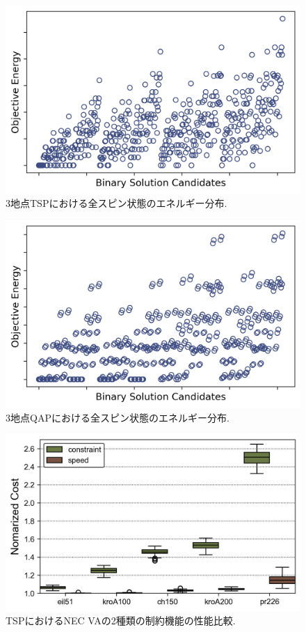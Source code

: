 \documentclass[submit,techrep,noauthor]{ipsj}
\begin{document}
\begin{figure}[hb]
\centering
\includegraphics[bb=0 0 700 250, width=15cm]{Energy_Landscape_TSP.png}
\caption{3地点TSPにおける全スピン状態のエネルギー分布.}
\label{TSP_energy_landscape}
\end{figure}

\begin{figure}[hb]
\centering
\includegraphics[bb=0 0 700 250, width=15cm]{Energy_Landscape_QAP.png}
\caption{3地点QAPにおける全スピン状態のエネルギー分布.}
\label{QAP_energy_landscape}
\end{figure}

\begin{figure}[hb]
\centering
\includegraphics[bb=0 0 700 250, width=15cm]{speed_vs_constraint_TSP.png}
\caption{TSPにおけるNEC VAの2種類の制約機能の性能比較.}
\label{TSP_speed_vs_const}
\end{figure}
\end{document}

